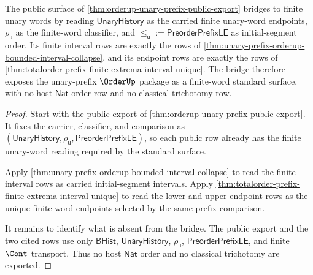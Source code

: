 \begin{theorem}
\label{thm:orderup-unary-prefix-standard-bridge-boundary}
The public surface of \autoref{thm:orderup-unary-prefix-public-export}
bridges to finite unary words by reading $\mathsf{UnaryHistory}$ as the
carried finite unary-word endpoints, $\rho_{\mathsf{u}}$ as the finite-word
classifier, and
$\le_{\mathsf{u}} := \mathsf{PreorderPrefixLE}$ as initial-segment order. Its
finite interval rows are exactly the rows of
\autoref{thm:unary-prefix-orderup-bounded-interval-collapse}, and its endpoint
rows are exactly the rows of
\autoref{thm:totalorder-prefix-finite-extrema-interval-unique}. The bridge
therefore exposes the unary-prefix $\OrderUp$ package as a finite-word
standard surface, with no host $\mathsf{Nat}$ order row and no classical
trichotomy row.
\end{theorem}
\begin{proof}
Start with the public export of
\autoref{thm:orderup-unary-prefix-public-export}. It fixes the carrier,
classifier, and comparison as
$(\mathsf{UnaryHistory},\rho_{\mathsf{u}},\mathsf{PreorderPrefixLE})$, so each
public row already has the finite unary-word reading required by the standard
surface.

Apply \autoref{thm:unary-prefix-orderup-bounded-interval-collapse} to read the
finite interval rows as carried initial-segment intervals. Apply
\autoref{thm:totalorder-prefix-finite-extrema-interval-unique} to read the
lower and upper endpoint rows as the unique finite-word endpoints selected by
the same prefix comparison.

It remains to identify what is absent from the bridge. The public export and
the two cited rows use only $\mathsf{BHist}$, $\mathsf{UnaryHistory}$,
$\rho_{\mathsf{u}}$, $\mathsf{PreorderPrefixLE}$, and finite $\Cont$ transport.
Thus no host $\mathsf{Nat}$ order and no classical trichotomy are exported.
\end{proof}

